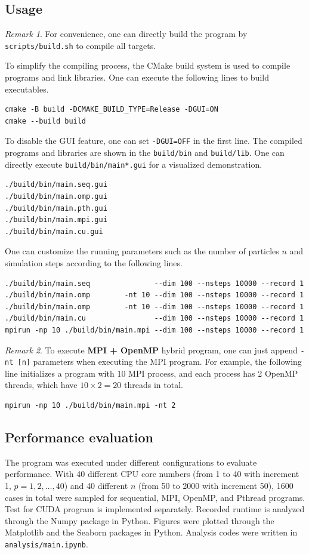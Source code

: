 \documentclass[twoside,12pt]{article}
\theoremstyle{definition}
\theoremstyle{remark}
\newtheorem*{remark}{Remark}
\begin{document}
\subsection{Usage}
\begin{remark}
For convenience, one can directly build the program by \lstinline|scripts/build.sh|
to compile all targets.
\end{remark}
To simplify the compiling process, the CMake build system is used
to compile programs and link libraries.
One can execute the following lines to build executables.
\begin{lstlisting}[style=sh]
cmake -B build -DCMAKE_BUILD_TYPE=Release -DGUI=ON
cmake --build build
\end{lstlisting}
To disable the GUI feature, one can set \lstinline|-DGUI=OFF| in the first line.
The compiled programs and libraries are shown in the \lstinline|build/bin| and
\lstinline|build/lib|.
One can directly execute \lstinline|build/bin/main*.gui| for a visualized demonstration.
\begin{lstlisting}[style=sh]
./build/bin/main.seq.gui
./build/bin/main.omp.gui
./build/bin/main.pth.gui
./build/bin/main.mpi.gui
./build/bin/main.cu.gui
\end{lstlisting}

One can customize the running parameters such as the number of particles $n$ and
simulation steps according to the following lines.
\begin{lstlisting}[style=sh]
./build/bin/main.seq               --dim 100 --nsteps 10000 --record 1
./build/bin/main.omp        -nt 10 --dim 100 --nsteps 10000 --record 1
./build/bin/main.omp        -nt 10 --dim 100 --nsteps 10000 --record 1
./build/bin/main.cu                --dim 100 --nsteps 10000 --record 1
mpirun -np 10 ./build/bin/main.mpi --dim 100 --nsteps 10000 --record 1
\end{lstlisting}
\begin{remark}
To execute \textbf{MPI + OpenMP} hybrid program, one can just append \lstinline|-nt [n]| parameters
when executing the MPI program.
For example, the following line initializes a program with 10 MPI process,
and each process has 2 OpenMP threads, which have $10\times 2=20$ threads in total.
\begin{lstlisting}[style=sh]
mpirun -np 10 ./build/bin/main.mpi -nt 2
\end{lstlisting}
\end{remark}


\subsection{Performance evaluation}
The program was executed under 
different configurations to evaluate performance.
With 40 different CPU core numbers (from 1 to 40 with increment 1, $p=1, 2,\dots, 40$)
and 40 different $n$ (from 50 to 2000 with increment 50),
1600 cases in total were sampled for sequential, MPI, OpenMP, and Pthread programs.
Test for CUDA program is implemented separately.
Recorded runtime is analyzed through the Numpy
package in Python.
Figures were plotted through the Matplotlib and the Seaborn packages in Python.
Analysis codes were written in \lstinline|analysis/main.ipynb|.
\end{document}
